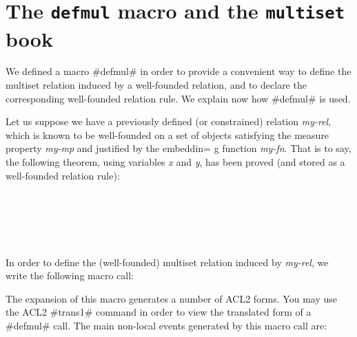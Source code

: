\documentclass[11pt]{llncs}
\begin{document}
{\section{The {\tt defmul} macro and the {\tt multiset} book}

We defined a macro #defmul# in order to provide a convenient way to
define the multiset relation induced by a well-founded relation, and to
declare the corresponding well-founded relation rule. We explain now how
#defmul# is used.

Let us suppose we have a previously defined (or constrained) relation
{\em my-rel}, which is known to be well-founded on a set of objects
satisfying the measure property {\it my-mp} and justified by the embeddin=
g
function {\em  my-fn}. That is to say, the following theorem, using
variables {\em x} and {\em y}, has been proved
(and stored as a well-founded relation rule):

\vspace{0.3cm}

 \\
 \\
 \\
 \\
\vspace{0.3cm}

In order to define the (well-founded) multiset relation induced by
{\em my-rel}, we write the following macro call:


\vspace{0.3cm}

\vspace{0.3cm}

The expansion of this macro generates a number of ACL2 forms. You may
use the ACL2 #trans1# command in order to view the translated form of
a #defmul# call. The main non-local events generated by this macro
call are:

}
\end{document}
